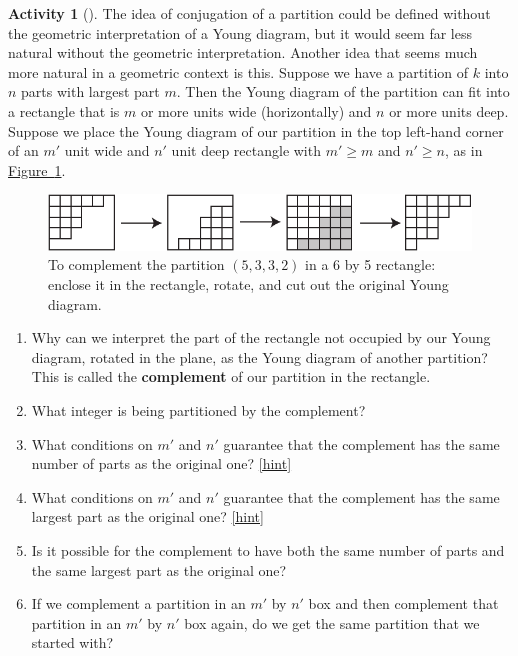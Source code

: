 \documentclass[10pt,]{book}
\newcommand{\terminology}[1]{\textbf{#1}}
\theoremstyle{plain}
\theoremstyle{definition}
\theoremstyle{definition}
\theoremstyle{definition}
\newtheorem{activity}[project]{Activity}
\numberwithin{equation}{chapter}
\begin{document}
\begin{activity}[]\label{activity-301}
\hypertarget{p-1516}{}%
The idea of conjugation of a partition could be defined without the geometric interpretation of a Young diagram, but it would seem far less natural without the geometric interpretation. Another idea that seems much more natural in a geometric context is this. Suppose we have a partition of \(k\) into \(n\) parts with largest part \(m\). Then the Young diagram of the partition can fit into a rectangle that is \(m\) or more units wide (horizontally) and \(n\) or more units deep. Suppose we place the Young diagram of our partition in the top left-hand corner of an \(m'\) unit wide and \(n'\) unit deep rectangle with \(m'\ge m\) and \(n' \ge n\), as in \hyperref[complementpartition]{Figure~\ref{complementpartition}}.%
\begin{figure}
\centering
\includegraphics[width=0.7\linewidth]{images/complementpartition}
\caption{To complement the partition \((5,3,3,2)\) in a 6 by 5 rectangle: enclose it in the rectangle, rotate, and cut out the original Young diagram.\label{complementpartition}}
\end{figure}
\begin{enumerate}[font=\bfseries,label=(\alph*),ref=\alph*]
\item\label{task-263} \hypertarget{p-1517}{}%
Why can we interpret the part of the rectangle not occupied by our Young diagram, rotated in the plane, as the Young diagram of another partition? This is called the \terminology{complement} of our partition in the rectangle.%
\item\label{task-264} \hypertarget{p-1519}{}%
What integer is being partitioned by the complement?%
\item\label{task-265} \hypertarget{p-1521}{}%
What conditions on \(m'\) and \(n'\) guarantee that the complement has the same number of parts as the original one?%
\hfill{\tiny\hyperlink{a-308.c}{[hint]}\hypertarget{q-308.c}{}}\item\label{task-266} \hypertarget{p-1524}{}%
What conditions on \(m'\) and \(n'\) guarantee that the complement has the same largest part as the original one?%
\hfill{\tiny\hyperlink{a-308.d}{[hint]}\hypertarget{q-308.d}{}}\item\label{task-267} \hypertarget{p-1527}{}%
Is it possible for the complement to have both the same number of parts and the same largest part as the original one?%
\item\label{task-268} \hypertarget{p-1529}{}%
If we complement a partition in an \(m'\) by \(n'\) box and then complement that partition in an \(m'\) by \(n'\) box again, do we get the same partition that we started with?%
\end{enumerate}
\end{activity}
\end{document}
